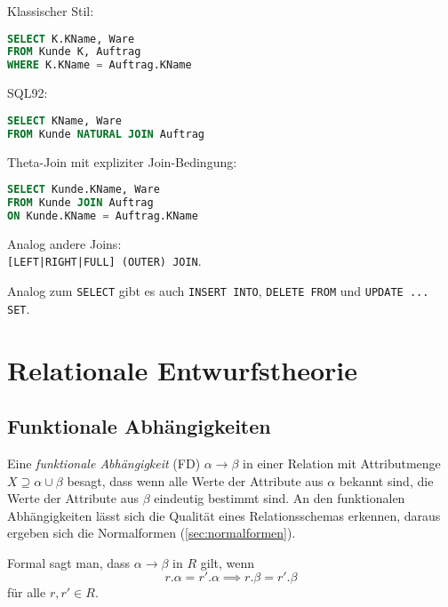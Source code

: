 \documentclass[a4paper,parskip=half*,DIV=15,fontsize=11pt]{scrartcl}
\newlength{\currentparskip}
\newenvironment{minipageparskip}
  {\setlength{\currentparskip}{\parskip} %
   \begin{minipage}{\textwidth} %
   \setlength{\parskip}{\currentparskip} %
  }
  {\end{minipage}}
\begin{document}
\begin{minipageparskip}
\begin{minipage}[t]{0.5\textwidth}
Klassischer Stil:
\begin{lstlisting}[language=SQL]
SELECT K.KName, Ware
FROM Kunde K, Auftrag
WHERE K.KName = Auftrag.KName
\end{lstlisting}
\end{minipage}
\begin{minipage}[t]{0.5\textwidth}
SQL92:
\begin{lstlisting}[language=SQL]
SELECT KName, Ware
FROM Kunde NATURAL JOIN Auftrag
\end{lstlisting}
\end{minipage}

\begin{minipage}[t]{0.5\textwidth}
Theta-Join mit expliziter Join-Bedingung:
\begin{lstlisting}[language=SQL]
SELECT Kunde.KName, Ware
FROM Kunde JOIN Auftrag
ON Kunde.KName = Auftrag.KName
\end{lstlisting}
\end{minipage}
\begin{minipage}[t]{0.5\textwidth}
Analog andere Joins:\\
\lstinline{[LEFT|RIGHT|FULL] (OUTER) JOIN}.
\end{minipage}
\end{minipageparskip}

Analog zum \lstinline{SELECT} gibt es auch \lstinline{INSERT INTO}, \lstinline{DELETE FROM} und \lstinline{UPDATE ... SET}.

\section{Relationale Entwurfstheorie}
\subsection{Funktionale Abhängigkeiten}
Eine \emph{funktionale Abhängigkeit} (FD) $\alpha \to \beta$ in einer Relation mit Attributmenge $X \supseteq \alpha \cup \beta$ besagt, dass wenn alle Werte der Attribute aus $\alpha$ bekannt sind, die Werte der Attribute aus $\beta$ eindeutig bestimmt sind. An den funktionalen Abhängigkeiten lässt sich die Qualität eines Relationsschemas erkennen, daraus ergeben sich die Normalformen (\ref{sec:normalformen}).

Formal sagt man, dass $\alpha \to \beta$ in $R$ gilt, wenn
\[r.\alpha = r'.\alpha \implies r.\beta = r'.\beta\]
für alle $r, r' \in R$.
\end{document}
